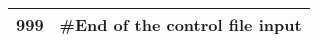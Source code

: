 \begin{longtable}{p{1.1cm} p{1.4cm} p{1.2cm} p{1.2cm} p{1.3cm} p{1.6cm} p{1.4cm} p{1.4cm} p{1.4cm}}
	
	\hline
	\bfseries{999} & \multicolumn{8}{l}{\#End of the control file input}\Tstrut\Bstrut\\
	\hline			
\end{longtable}



	
	

	

